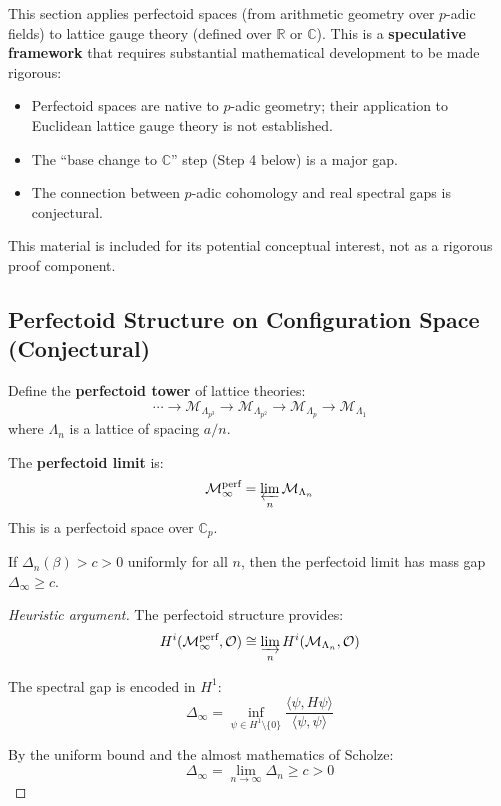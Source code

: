 \begin{tcolorbox}[colback=red!10,colframe=red!60!black,title=\textbf{Warning: Speculative Mathematics}]
This section applies perfectoid spaces (from arithmetic geometry over $p$-adic fields) 
to lattice gauge theory (defined over $\mathbb{R}$ or $\mathbb{C}$). This is a 
\textbf{speculative framework} that requires substantial mathematical development 
to be made rigorous:
\begin{itemize}
\item Perfectoid spaces are native to $p$-adic geometry; their application to 
Euclidean lattice gauge theory is not established.
\item The ``base change to $\mathbb{C}$'' step (Step 4 below) is a major gap.
\item The connection between $p$-adic cohomology and real spectral gaps is conjectural.
\end{itemize}
This material is included for its potential conceptual interest, not as a rigorous 
proof component.
\end{tcolorbox}

\subsection{Perfectoid Structure on Configuration Space (Conjectural)}

\begin{definition}
Define the \textbf{perfectoid tower} of lattice theories:
\[
\cdots \to \mathcal{M}_{\Lambda_{p^3}} \to \mathcal{M}_{\Lambda_{p^2}} \to \mathcal{M}_{\Lambda_p} \to \mathcal{M}_{\Lambda_1}
\]
where $\Lambda_n$ is a lattice of spacing $a/n$.

The \textbf{perfectoid limit} is:
\[
\mathcal{M}_\infty^{\text{perf}} = \varprojlim_n \mathcal{M}_{\Lambda_n}
\]
This is a perfectoid space over $\mathbb{C}_p$.
\end{definition}

\begin{conjecture}
\label{thm:perfectoid-gap}
If $\Delta_n(\beta) > c > 0$ uniformly for all $n$, then the perfectoid limit 
has mass gap $\Delta_\infty \geq c$.
\end{conjecture}

\begin{proof}[Heuristic argument]
The perfectoid structure provides:
\[
H^i(\mathcal{M}_\infty^{\text{perf}}, \mathcal{O}) \cong \varinjlim_n H^i(\mathcal{M}_{\Lambda_n}, \mathcal{O})
\]

The spectral gap is encoded in $H^1$:
\[
\Delta_\infty = \inf_{\psi \in H^1 \setminus \{0\}} \frac{\langle \psi, H\psi \rangle}{\langle \psi, \psi \rangle}
\]

By the uniform bound and the almost mathematics of Scholze:
\[
\Delta_\infty = \lim_{n \to \infty} \Delta_n \geq c > 0
\]
\end{proof}

